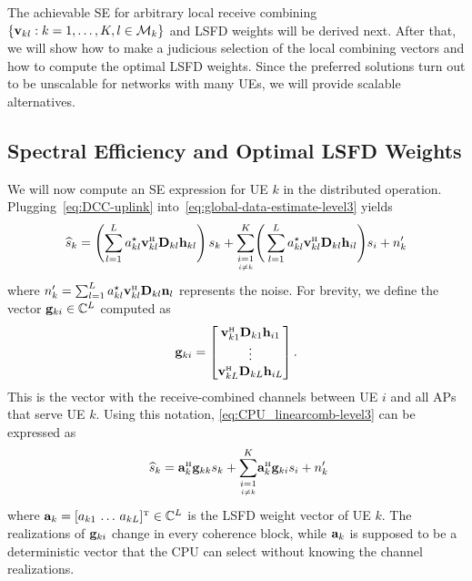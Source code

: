 The achievable SE for arbitrary local receive combining $\{\mathbf{v}_{kl} : k=1,\ldots,K, l\in  \mathcal{M}_k\}$ and LSFD weights will be derived next. After that, we will show how to make a judicious selection of the local combining vectors and how to compute the optimal LSFD weights. Since the preferred solutions turn out to be unscalable for networks with many UEs, we will provide scalable alternatives.

\subsection{Spectral Efficiency and Optimal LSFD Weights}
\label{sec:level3-SE}

We will now compute an SE expression for UE $k$ in the distributed operation. Plugging~\eqref{eq:DCC-uplink} into~\eqref{eq:global-data-estimate-level3} yields
\begin{align} 
\widehat{s}_k =\left(\sum_{l=1}^{L} a_{kl}^{\star} \vect{v}_{kl}^{\Htran}\vect{D}_{kl} \vect{h}_{kl}\right) s_k +\condSum{i=1}{i \neq k}{K}  \Bigg(\sum_{l=1}^{L} a_{kl}^{\star} \vect{v}_{kl}^{\Htran} \vect{D}_{kl}\vect{h}_{il}\Bigg)  s_i + n^\prime_{k}\label{eq:CPU_linearcomb-level3}
\end{align}
where $n^\prime_{k} = \sum_{l=1}^{L} a_{kl}^{\star} \vect{v}_{kl}^{\Htran}\vect{D}_{kl}\vect{n}_{l}$ represents the noise. For brevity, we define the vector $\mathbf{g}_{ki} \in \mathbb{C}^L$ computed as
\begin{equation}
 \vect{g}_{ki} = \begin{bmatrix}
 \vect{v}_{k1}^{\Htran}\vect{D}_{k1} \vect{h}_{i1} \\
 \vdots \\
  \vect{v}_{kL}^{\Htran} \vect{D}_{kL} \vect{h}_{iL}
  \end{bmatrix}.
  \end{equation}
 This is the vector with the receive-combined channels between UE $i$ and all APs that serve UE $k$. Using this notation, \eqref{eq:CPU_linearcomb-level3} can be expressed as 
\begin{align} 
\widehat{s}_k =\vect{a}_{k}^{\Htran}\vect{g}_{kk} s_k + \condSum{i=1}{i \neq k}{K}\vect{a}_{k}^{\Htran}\vect{g}_{ki}  s_i + n^\prime_{k} \!\!\label{eq:CPU_linearcomb_eff-level3}
\end{align}
where $\vect{a}_{k} = [ a_{k1} \, \ldots \, a_{kL} ]^{\Ttran} \in \mathbb{C}^L$ is the LSFD weight vector of UE $k$. The realizations of $\mathbf{g}_{ki}$ change in every coherence block, while $\mathbf{a}_{k}$ is supposed to be a deterministic vector that the CPU can select without knowing the channel realizations.
